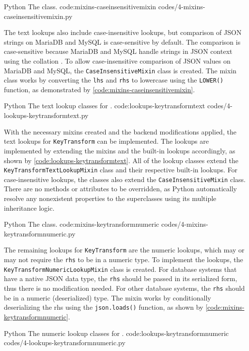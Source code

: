 \listing
{Python}
{The  class.}
{code:mixins-caseinsensitivemixin}
{codes/4-mixins-caseinsensitivemixin.py}

The text lookups also include case-insensitive lookups, but comparison of JSON
strings on MariaDB and MySQL is case-sensitive by default. The comparison is
case-sensitive because MariaDB and MySQL handle strings in JSON context using
the  collation \cite{mysql:json}. To allow case-insensitive
comparison of JSON values on MariaDB and MySQL, the \verb|CaseInsensitiveMixin|
class is created. The mixin class works by converting the \verb|lhs| and
\verb|rhs| to lowercase using the \verb|LOWER()| function, as demonstrated by
\autoref{code:mixins-caseinsensitivemixin}.

\listing
{Python}
{The text lookup classes for .}
{code:lookups-keytransformtext}
{codes/4-lookups-keytransformtext.py}

With the necessary mixins created and the backend modifications applied, the
text lookups for \verb|KeyTransform| can be implemented. The lookups are
implemented by extending the mixins and the built-in lookups accordingly, as
shown by \autoref{code:lookups-keytransformtext}. All of the lookup classes
extend the \verb|KeyTransformTextLookupMixin| class and their respective
built-in lookups. For case-insensitive lookups, the classes also extend the
\verb|CaseInsensitiveMixin| class. There are no methods or attributes to be
overridden, as Python automatically resolve any nonexistent properties to the
superclasses using its multiple inheritance logic.

\listing
{Python}
{The  class.}
{code:mixins-keytransformnumeric}
{codes/4-mixins-keytransformnumeric.py}

The remaining lookups for \verb|KeyTransform| are the numeric lookups, which
may or may not require the \verb|rhs| to be in a numeric type. To implement
the lookups, the \verb|KeyTransformNumericLookupMixin| class is created. For
database systems that have a native JSON data type, the \verb|rhs| should be
passed in its serialized form, thus there is no modification needed. For other
database systems, the \verb|rhs| should be in a numeric (deserialized) type.
The mixin works by conditionally deserializing the rhs using the
\verb|json.loads()| function, as shown by
\autoref{code:mixins-keytransformnumeric}.

\listing
{Python}
{The numeric lookup classes for .}
{code:lookups-keytransformnumeric}
{codes/4-lookups-keytransformnumeric.py}

